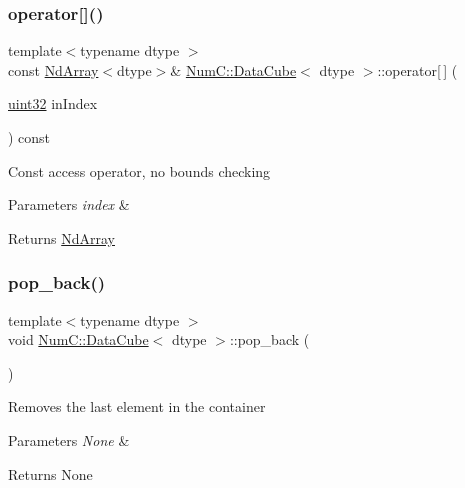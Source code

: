 \subsubsection{\texorpdfstring{operator[]()}{operator[]()}\hspace{0.1cm}{\footnotesize\ttfamily [2/2]}}
{\footnotesize\ttfamily template$<$typename dtype $>$ \\
const \mbox{\hyperlink{class_num_c_1_1_nd_array}{Nd\+Array}}$<$dtype$>$\& \mbox{\hyperlink{class_num_c_1_1_data_cube}{Num\+C\+::\+Data\+Cube}}$<$ dtype $>$\+::operator\mbox{[}$\,$\mbox{]} (\begin{DoxyParamCaption}\item[{\mbox{\hyperlink{namespace_num_c_ae685802ca6d3035f2b400b081e3953fa}{uint32}}}]{in\+Index }\end{DoxyParamCaption}) const\hspace{0.3cm}{\ttfamily [inline]}}

Const access operator, no bounds checking


\begin{DoxyParams}{Parameters}
{\em index} & \\
\hline
\end{DoxyParams}
\begin{DoxyReturn}{Returns}
\mbox{\hyperlink{class_num_c_1_1_nd_array}{Nd\+Array}} 
\end{DoxyReturn}
\mbox{\label{class_num_c_1_1_data_cube_acdd92c25e800265b8d142b9f1a4baaa8}} 
\subsubsection{\texorpdfstring{pop\+\_\+back()}{pop\_back()}}
{\footnotesize\ttfamily template$<$typename dtype $>$ \\
void \mbox{\hyperlink{class_num_c_1_1_data_cube}{Num\+C\+::\+Data\+Cube}}$<$ dtype $>$\+::pop\+\_\+back (\begin{DoxyParamCaption}{ }\end{DoxyParamCaption})\hspace{0.3cm}{\ttfamily [inline]}}

Removes the last element in the container


\begin{DoxyParams}{Parameters}
{\em None} & \\
\hline
\end{DoxyParams}
\begin{DoxyReturn}{Returns}
None 
\end{DoxyReturn}
\mbox{\label{class_num_c_1_1_data_cube_a92928548c47184fda99c6759c1640421}} 
